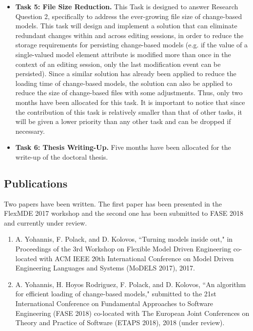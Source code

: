 \documentclass[12pt, a4paper]{report} \usepackage[titletoc]{appendix}
\begin{document}
\begin{itemize}
    \item \textbf{Task 5: File Size Reduction.} This Task is designed to answer Research Question 2, specifically to address the ever-growing file size of change-based models. This task will design and implement a solution that can eliminate redundant changes within and across editing sessions, in order to reduce the storage requirements for persisting change-based models (e.g. if the value of a single-valued model element attribute is modified more than once in the context of an editing session, only the last modification event can be persisted). Since a similar solution has already been applied to reduce the loading time of change-based models, the solution can also be applied to reduce the size of change-based files with some adjustments. Thus, only two months have been allocated for this task. It is important to notice that since the contribution of this task is relatively smaller than that of other tasks, it will be given a lower priority than any other task and can be dropped if necessary.
    \item \textbf{Task 6: Thesis Writing-Up.} Five months have been allocated for the write-up of the doctoral thesis.  
\end{itemize}




\begin{appendices}
    \chapter{Publications}
    \label{ch:publications}
    Two papers have been written. The first paper \cite{yohannis2017turning} has been presented in the FlexMDE 2017 workshop and the second one \cite{yohannis2018algorithm} has been submitted to FASE 2018 and currently under review.
    \begin{enumerate}
        \item A. Yohannis, F. Polack, and D. Kolovos, ``Turning models inside out," in Proceedings of the 3rd Workshop on Flexible Model Driven Engineering co-located with ACM IEEE 20th International Conference on Model Driven Engineering Languages and Systems (MoDELS 2017), 2017.
        \item  A. Yohannis, H. Hoyos Rodriguez, F. Polack, and D. Kolovos, ``An algorithm for efficient loading of change-based models," submitted to the 21st International Conference on Fundamental Approaches to Software Engineering (FASE 2018) co-located with The European Joint Conferences on Theory and Practice of Software (ETAPS 2018), 2018 (under review).
    \end{enumerate}
\end{appendices}

\end{document}

